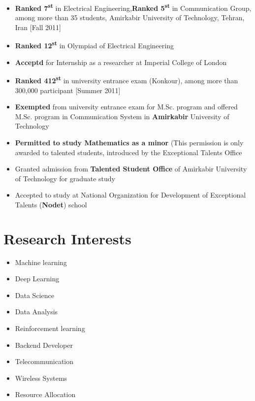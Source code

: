 \documentclass[10pt,a4paper,sans]{moderncv} %
\begin{document}
\begin{itemize}
\item \textbf{Ranked 7\textsuperscript{st}} in Electrical Engineering,\textbf{Ranked 5\textsuperscript{st}} in Communication Group, among more than 35 students,
Amirkabir University of Technology, Tehran, Iran [Fall 2011]
\item \textbf{Ranked 12\textsuperscript{st}} in Olympiad of Electrical Engineering
\item \textbf {Acceptd}  for Internship as a researcher at Imperial College of London
\item \textbf{Ranked 412\textsuperscript{st}} in university entrance exam (Konkour), among more than 300,000
participant [Summer 2011]
\item \textbf{Exempted} from university entrance exam for M.Sc. program and offered M.Sc. program in Communication System in \textbf{Amirkabir} University of Technology
\item \textbf{Permitted to study Mathematics as a minor} (This permission is only awarded to talented students, introduced by the Exceptional Talents Office
\item Granted admission from \textbf{Talented Student Office} of Amirkabir University of Technology for graduate
study
\item Accepted to study at National Organization for Development of Exceptional Talents (\textbf{Nodet}) school
\end{itemize}

\section{Research Interests}
\begin{multicols}{2} 
\begin{itemize}
\item{Machine learning}
\item{Deep Learning}
\item{Data Science}
\item{Data Analysis}
\item{Reinforcement learning}
\item{Backend Developer}
\item{Telecommunication}
\item{Wireless Systems}
\item{Resource Allocation}

\end{itemize}
\end{multicols}
\end{document}
